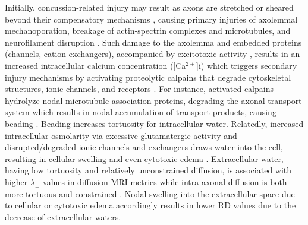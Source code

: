 \documentclass[12pt]{article}
\begin{document}
Initially, concussion-related injury may result as axons are stretched or sheared beyond their compensatory mechanisms \parencite[e.g. spectrin elongation;][]{dubey2020AxonalActinspectrinLattice}, causing primary injuries of axolemmal mechanoporation, breakage of actin-spectrin complexes and microtubules, and neurofilament disruption \parencite{christman1994UltrastructuralStudiesDiffuse,povlishock1997ImpactAccelerationInjury,pettus1996CharacterizationDistinctSet}. Such damage to the axolemma and embedded proteins (channels, cation exchangers), accompanied by excitotoxic activity \parencite{baracaldo-santamaria2022RevisitingExcitotoxicityTraumatic}, results in an increased intracellular calcium concentration ([Ca$^{2+}$]i) which triggers secondary injury mechanisms by activating proteolytic calpains that degrade cytoskeletal structures, ionic channels, and receptors \parencite{krieg2023IdentifyingPhenotypesDiffuse}. For instance, activated calpains hydrolyze nodal microtubule-association proteins, degrading the axonal transport system which results in nodal accumulation of transport products, causing beading \parencite[i.e. varicosities, when stained for $\beta$-amyloid precursor protein;][]{ma2013RoleCalpainsInjuryinduced,johnson2013AxonalPathologyTraumatic,shin2020AxonalTransportDysfunction}. Beading increases tortuosity for intracellular water. Relatedly, increased intracellular osmolarity via excessive glutamatergic activity and disrupted/degraded ionic channels and exchangers draws water into the cell, resulting in cellular swelling and even cytotoxic edema \parencite{rungta2015CellularMechanismsNeuronal,liang2007CytotoxicEdemaMechanisms,baracaldo-santamaria2022RevisitingExcitotoxicityTraumatic}. Extracellular water, having low tortuosity and relatively unconstrained diffusion, is associated with higher $\lambda_\perp$ values in diffusion MRI metrics while intra-axonal diffusion is both more tortuous and constrained \parencite{mayer2010ProspectiveDiffusionTensor,rosenblum2007CytotoxicEdemaMonitoring,winklewski2018UnderstandingPhysiopathologyAxial}. Nodal swelling into the extracellular space due to cellular or cytotoxic edema accordingly results in lower RD values due to the decrease of extracellular waters.
\end{document}
